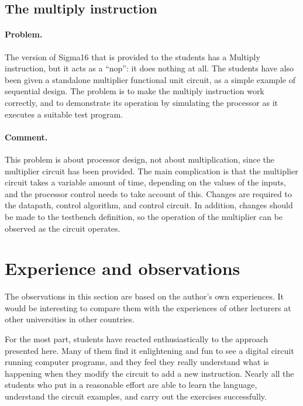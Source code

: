 \documentclass[submission,copyright,creativecommons]{eptcs}
\begin{document}
\subsection{The multiply instruction}

\paragraph{Problem.} The version of Sigma16 that is provided to the
students has a Multiply instruction, but it acts as a ``nop'': it
does nothing at all.  The students have also been given a
standalone multiplier functional unit circuit, as a simple example
of sequential design.  The problem is to make the multiply
instruction work correctly, and to demonstrate its operation by
simulating the processor as it executes a suitable test program.

\paragraph{Comment.}
This problem is about processor design, not about multiplication,
since the multiplier circuit has been provided.  The main
complication is that the multiplier circuit takes a variable amount
of time, depending on the values of the inputs, and the processor
control needs to take account of this.  Changes are required to the
datapath, control algorithm, and control circuit.  In addition,
changes should be made to the testbench definition, so the
operation of the multiplier can be observed as the circuit
operates.

\section{Experience and observations}
\label{sec:observations}

The observations in this section are based on the author's own
experiences.  It would be interesting to compare them with the
experiences of other lecturers at other universities in other
countries.

For the most part, students have reacted enthusiastically to the
approach presented here.  Many of them find it enlightening and fun to
see a digital circuit running computer programs, and they feel they
really understand what is happening when they modify the circuit to
add a new instruction.  Nearly all the students who put in a
reasonable effort are able to learn the language, understand the
circuit examples, and carry out the exercises successfully.
\end{document}
